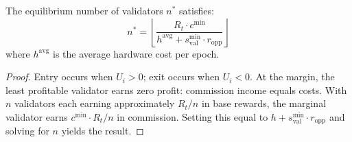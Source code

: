\begin{proposition}
The equilibrium number of validators $n^*$ satisfies:
\begin{equation}
    n^* = \left\lfloor \frac{R_t \cdot c^{\min}}{h^{\text{avg}} + s^{\min}_{\text{val}} \cdot r_{\text{opp}}} \right\rfloor
\end{equation}
where $h^{\text{avg}}$ is the average hardware cost per epoch.
\end{proposition}

\begin{proof}
Entry occurs when $U_i > 0$; exit occurs when $U_i < 0$. At the margin, the least profitable validator earns zero profit: commission income equals costs. With $n$ validators each earning approximately $R_t / n$ in base rewards, the marginal validator earns $c^{\min} \cdot R_t / n$ in commission. Setting this equal to $h + s^{\min}_{\text{val}} \cdot r_{\text{opp}}$ and solving for $n$ yields the result.
\end{proof}

